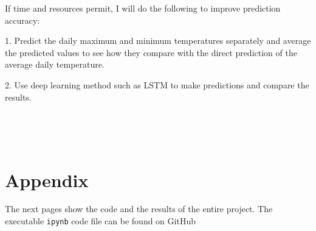 \documentclass{article}
\begin{document}
If time and resources permit, I will do the following to improve prediction accuracy:

1. Predict the daily maximum and minimum temperatures separately and average the predicted values to see how they compare with the direct prediction of the average daily temperature.

2. Use deep learning method such as LSTM to make predictions and compare the results.

\ 

\ 


\section{Appendix}

The next pages show the code and the results of the entire project. The executable \verb|ipynb| code file can be found on GitHub 
\end{document}
